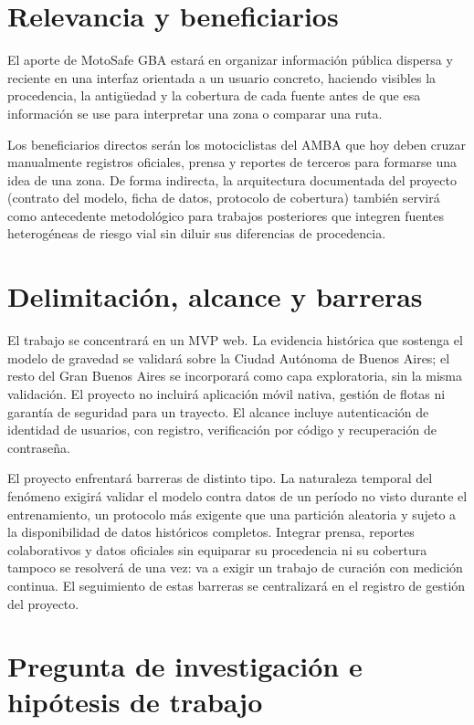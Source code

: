 \section{Relevancia y beneficiarios}

El aporte de MotoSafe GBA estará en organizar información pública
dispersa y reciente en una interfaz orientada a un usuario concreto,
haciendo visibles la procedencia, la antigüedad y la cobertura de cada
fuente antes de que esa información se use para interpretar una zona o
comparar una ruta.

Los beneficiarios directos serán los motociclistas del AMBA que hoy
deben cruzar manualmente registros oficiales, prensa y reportes de
terceros para formarse una idea de una zona. De forma indirecta, la
arquitectura documentada del proyecto (contrato del modelo, ficha de
datos, protocolo de cobertura) también servirá como antecedente
metodológico para trabajos posteriores que integren fuentes heterogéneas
de riesgo vial sin diluir sus diferencias de procedencia.

\section{Delimitación, alcance y barreras}

El trabajo se concentrará en un MVP web. La evidencia histórica que
sostenga el modelo de gravedad se validará sobre la Ciudad Autónoma de
Buenos Aires; el resto del Gran Buenos Aires se incorporará como capa
exploratoria, sin la misma validación. El proyecto no incluirá
aplicación móvil nativa, gestión de flotas ni garantía de seguridad para
un trayecto. El alcance incluye autenticación de identidad de usuarios,
con registro, verificación por código y recuperación de contraseña.

El proyecto enfrentará barreras de distinto tipo. La naturaleza temporal
del fenómeno exigirá validar el modelo contra datos de un período no
visto durante el entrenamiento, un protocolo más exigente que una
partición aleatoria y sujeto a la disponibilidad de datos históricos
completos. Integrar prensa, reportes colaborativos y datos oficiales sin
equiparar su procedencia ni su cobertura tampoco se resolverá de una
vez: va a exigir un trabajo de curación con medición continua. El
seguimiento de estas barreras se centralizará en el registro de gestión
del proyecto.

\section{Pregunta de investigación e hipótesis de trabajo}


